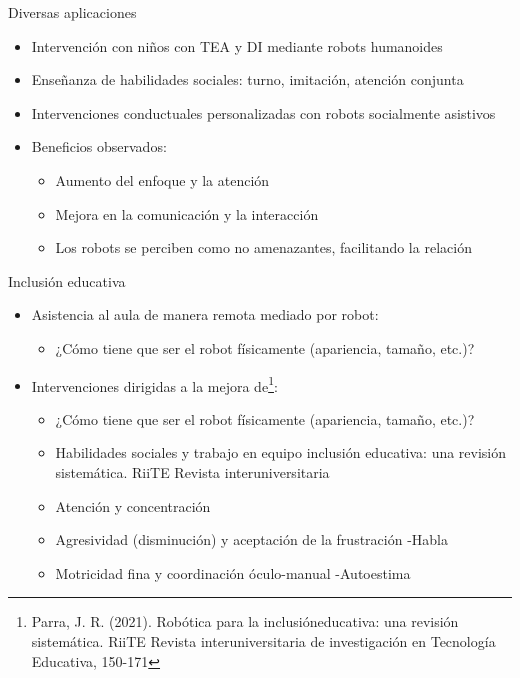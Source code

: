 \documentclass[aspectratio=169]{beamer}
\begin{document}
\begin{frame}{Diversas aplicaciones}
  \small
  \begin{itemize}
    \item Intervención con niños con TEA y DI mediante robots humanoides
    \item Enseñanza de habilidades sociales: turno, imitación, atención conjunta
    \item Intervenciones conductuales personalizadas con robots socialmente asistivos
    \item Beneficios observados:
    \begin{itemize}
      \item Aumento del enfoque y la atención
      \item Mejora en la comunicación y la interacción
      \item Los robots se perciben como no amenazantes, facilitando la relación
    \end{itemize}
  \end{itemize}
\end{frame}

\begin{frame}{Inclusión educativa}
  \small
  \begin{itemize}
    \item Asistencia al aula de manera remota mediado por robot:
    \begin{itemize}
      \item ¿Cómo tiene que ser el robot físicamente (apariencia, tamaño, etc.)?
    \end{itemize}
    \item Intervenciones dirigidas a la mejora de\footnote{Parra, J. R. (2021). Robótica para la inclusióneducativa: una revisión sistemática. RiiTE Revista interuniversitaria de investigación en Tecnología Educativa, 150-171}:
    \begin{itemize}
      \item ¿Cómo tiene que ser el robot físicamente (apariencia, tamaño, etc.)?
      \item Habilidades sociales y trabajo en equipo inclusión educativa: una revisión sistemática. RiiTE Revista interuniversitaria
      \item Atención y concentración
      \item Agresividad (disminución) y aceptación de la frustración -Habla
      \item Motricidad fina y coordinación óculo-manual -Autoestima
    \end{itemize}
  \end{itemize}
\end{frame}
\end{document}
